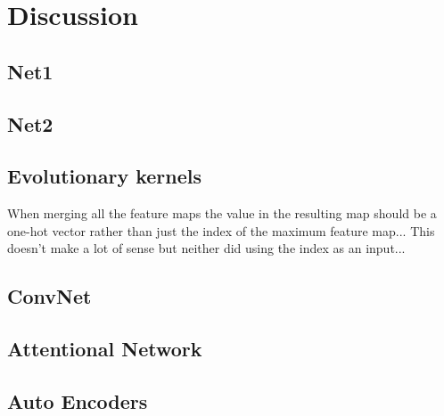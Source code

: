 \chapter{Discussion}
\label{ch:discussion}



\section{Net1}
\label{sec:net1discuss}


\section{Net2}
\label{sec:net2discuss}

\pagebreak
\section{Evolutionary kernels}

When merging all the feature maps the value in the resulting map should be a one-hot vector rather than just the index of the maximum feature map... This doesn't make a lot of sense but neither did using the index as an input... 

\section{ConvNet}

\pagebreak
\section{Attentional Network}

\section{Auto Encoders}



\pagebreak
\pagebreak
\pagebreak
\pagebreak


